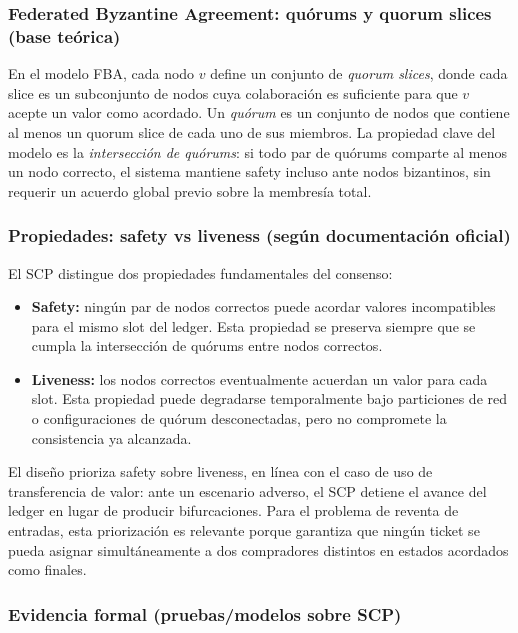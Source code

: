 \subsubsection{Federated Byzantine Agreement: quórums y quorum slices (base teórica)}

En el modelo FBA, cada nodo \(v\) define un conjunto de \textit{quorum slices}, donde cada slice es un subconjunto de nodos cuya colaboración es suficiente para que \(v\) acepte un valor como acordado. Un \textit{quórum} es un conjunto de nodos que contiene al menos un quorum slice de cada uno de sus miembros. La propiedad clave del modelo es la \textit{intersección de quórums}: si todo par de quórums comparte al menos un nodo correcto, el sistema mantiene safety incluso ante nodos bizantinos, sin requerir un acuerdo global previo sobre la membresía total.

\subsubsection{Propiedades: safety vs liveness (según documentación oficial)}

El SCP distingue dos propiedades fundamentales del consenso:

\begin{itemize}
    \item \textbf{Safety:} ningún par de nodos correctos puede acordar valores incompatibles para el mismo slot del ledger. Esta propiedad se preserva siempre que se cumpla la intersección de quórums entre nodos correctos.
    \item \textbf{Liveness:} los nodos correctos eventualmente acuerdan un valor para cada slot. Esta propiedad puede degradarse temporalmente bajo particiones de red o configuraciones de quórum desconectadas, pero no compromete la consistencia ya alcanzada.
\end{itemize}

El diseño prioriza safety sobre liveness, en línea con el caso de uso de transferencia de valor: ante un escenario adverso, el SCP detiene el avance del ledger en lugar de producir bifurcaciones. Para el problema de reventa de entradas, esta priorización es relevante porque garantiza que ningún ticket se pueda asignar simultáneamente a dos compradores distintos en estados acordados como finales.

\subsubsection{Evidencia formal (pruebas/modelos sobre SCP)}

